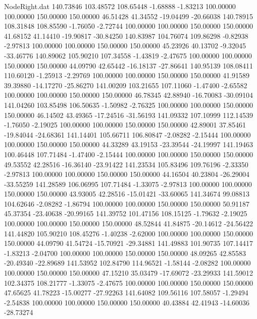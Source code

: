 \begin{filecontents}{NodeRight.dat}
 140.73846  103.48572  108.65448    -1.68888   -1.83213  100.00000  100.00000  150.00000  150.00000   46.51428   41.34552  -19.04499  -20.66038
 140.78915  108.31848  108.85590    -1.76050   -2.72744  100.00000  100.00000  150.00000  150.00000   41.68152   41.14410  -19.90817  -30.84250
 140.83987  104.76074  109.86298    -0.82938   -2.97813  100.00000  100.00000  150.00000  150.00000   45.23926   40.13702   -9.32045  -33.46776
 140.89062  105.90210  107.34558    -1.43819   -2.47675  100.00000  100.00000  150.00000  150.00000   44.09790   42.65442  -16.18137  -27.86641
 140.95139  108.08411  110.60120    -1.25913   -2.29769  100.00000  100.00000  150.00000  150.00000   41.91589   39.39880  -14.17270  -25.86270
 141.00209  103.21655  107.11060    -1.47400   -2.65582  100.00000  100.00000  150.00000  150.00000   46.78345   42.88940  -16.70083  -30.09104
 141.04260  103.85498  106.50635    -1.50982   -2.76325  100.00000  100.00000  150.00000  150.00000   46.14502   43.49365  -17.24516  -31.56193
 141.09332  107.10999  112.14539    -1.76050   -2.19025  100.00000  100.00000  150.00000  150.00000   42.89001   37.85461  -19.84044  -24.68361
 141.14401  105.66711  106.80847    -2.08282   -2.15444  100.00000  100.00000  150.00000  150.00000   44.33289   43.19153  -23.39544  -24.19997
 141.19463  100.46448  107.71484    -1.47400   -2.15444  100.00000  100.00000  150.00000  150.00000   49.53552   42.28516  -16.36140  -23.91422
 141.23534  105.83496  109.76196    -2.33350   -2.97813  100.00000  100.00000  150.00000  150.00000   44.16504   40.23804  -26.29004  -33.55259
 141.28589  106.06995  107.71484    -1.33075   -2.97813  100.00000  100.00000  150.00000  150.00000   43.93005   42.28516  -15.01421  -33.60065
 141.34674   99.08813  104.62646    -2.08282   -1.86794  100.00000  100.00000  150.00000  150.00000   50.91187   45.37354  -23.40638  -20.99165
 141.39752  101.47156  108.15125    -1.79632   -2.19025  100.00000  100.00000  150.00000  150.00000   48.52844   41.84875  -20.14612  -24.56422
 141.44820  105.90210  108.45276    -1.40238   -2.62000  100.00000  100.00000  150.00000  150.00000   44.09790   41.54724  -15.70921  -29.34881
 141.49883  101.90735  107.14417    -1.83213   -2.04700  100.00000  100.00000  150.00000  150.00000   48.09265   42.85583  -20.49340  -22.89689
 141.53952  102.84790  114.96521    -1.58144   -2.08282  100.00000  100.00000  150.00000  150.00000   47.15210   35.03479  -17.69072  -23.29933
 141.59012  102.34375  108.21777    -1.33075   -2.47675  100.00000  100.00000  150.00000  150.00000   47.65625   41.78223  -15.00277  -27.92263
 141.64082  109.56116  107.58057    -1.29494   -2.54838  100.00000  100.00000  150.00000  150.00000   40.43884   42.41943  -14.60036  -28.73274

\end{filecontents}

